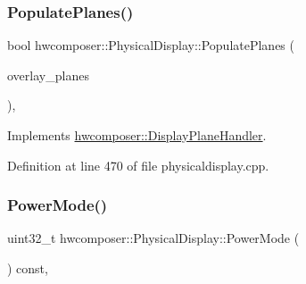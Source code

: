 \subsubsection{\texorpdfstring{Populate\+Planes()}{PopulatePlanes()}}
{\footnotesize\ttfamily bool hwcomposer\+::\+Physical\+Display\+::\+Populate\+Planes (\begin{DoxyParamCaption}\item[{std\+::vector$<$ std\+::unique\+\_\+ptr$<$ \mbox{\hyperlink{classhwcomposer_1_1DisplayPlane}{Display\+Plane}} $>$$>$ \&}]{overlay\+\_\+planes }\end{DoxyParamCaption})\hspace{0.3cm}{\ttfamily [override]}, {\ttfamily [virtual]}}



Implements \mbox{\hyperlink{classhwcomposer_1_1DisplayPlaneHandler_aa4d32269c693dbf4a4c91c31ed577784}{hwcomposer\+::\+Display\+Plane\+Handler}}.



Definition at line 470 of file physicaldisplay.\+cpp.


\begin{DoxyCode}{0}
\end{DoxyCode}
\mbox{\label{classhwcomposer_1_1PhysicalDisplay_a8339a14dbaa5ac9a1d4d4c3dc3694a10}} 
\subsubsection{\texorpdfstring{Power\+Mode()}{PowerMode()}}
{\footnotesize\ttfamily uint32\+\_\+t hwcomposer\+::\+Physical\+Display\+::\+Power\+Mode (\begin{DoxyParamCaption}{ }\end{DoxyParamCaption}) const\hspace{0.3cm}{\ttfamily [override]}, {\ttfamily [virtual]}}




